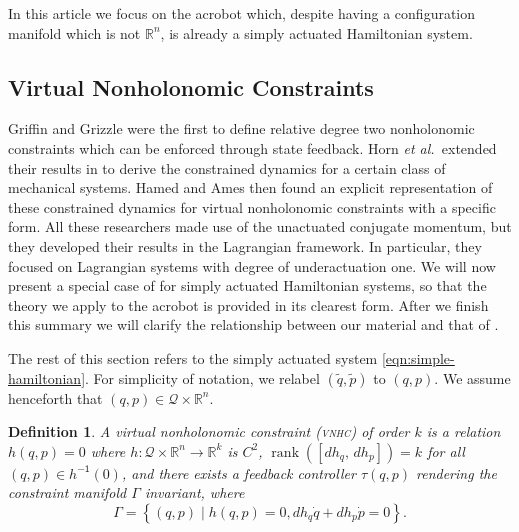\documentclass[journal,twoside,web, twocolumn,draftcls]{ieeecolor}
\newtheorem{defn}{Definition} %
\DeclareMathOperator{\Rank}{rank}
\newcommand*{\rank}[1]{\Rank\left(#1\right)}
\newcommand*{\inv}{^\mathsf{-1}}
\newcommand*{\R}{\mathbb{R}}
\renewcommand*{\Re}{\mathbb{R}}
\newcommand*{\etal}{\MakeLowercase{\textit{et al.~}}}
\newcommand*{\cQ}{\mathcal{Q}}
\newcommand*{\vnhc}{\textsc{vnhc}\xspace}
\begin{document}
In this article we focus on the acrobot which, despite having a configuration
manifold which is not \(\R^n\), is already a simply actuated Hamiltonian system.

\subsection{Virtual Nonholonomic Constraints}\label{sec:vnhc-vnhc}

Griffin and Grizzle \cite{nhvc_dynamic_walking} were the first to define
relative degree two nonholonomic constraints which can be enforced through state
feedback. Horn \etal extended their results in
\cite{hybrid_zero_dynamics_bipedal_nhvcs} to derive the constrained dynamics for
a certain class of mechanical systems. 
Hamed and Ames \cite{nonholonomic_hybrid_zero_dynamics} then found an explicit
representation of these constrained dynamics for virtual
nonholonomic constraints with a specific form.
All these researchers made use of the
unactuated conjugate momentum, but they developed their results in the
Lagrangian framework. In particular, they focused on Lagrangian systems with
degree of underactuation one. We will now present a special case of
\cite{hybrid_zero_dynamics_bipedal_nhvcs} for simply actuated Hamiltonian
systems, so that the theory we apply to the acrobot is provided in its clearest
form. After we finish this summary we will clarify the relationship between our
material and that of 
\cite{hybrid_zero_dynamics_bipedal_nhvcs,nonholonomic_hybrid_zero_dynamics}.

The rest of this section refers to the simply actuated system
\eqref{eqn:simple-hamiltonian}. For simplicity of notation, we relabel
\((\tilde{q},\tilde{p})\) to \((q,p)\). We assume henceforth that 
$(q,p) \in \cQ \times \Re^n$.

\begin{defn}\label{defn:vnhc}
    A \textit{virtual nonholonomic constraint} (\vnhc) \textit{of order \(k\)}
    is a relation \(h(q,p) = 0\) where 
    \(h : \mathcal{Q}\times\R^n \rightarrow \R^k\) is \(C^2\),
    \(\rank{\left[ dh_q,\, dh_p \right]} = k\) for all 
    \((q,p) \in h\inv(0)\), and there exists a feedback
    controller \(\tau(q,p)\) rendering the \textit{constraint manifold}
    \(\Gamma\) invariant, where
    \begin{equation}
        \Gamma = \left\{(q,p) \mid h(q,p) = 0, dh_q \dot{q} + dh_p \dot{p} = 0\right\}
        .
    \end{equation}
\end{defn}
\end{document}
